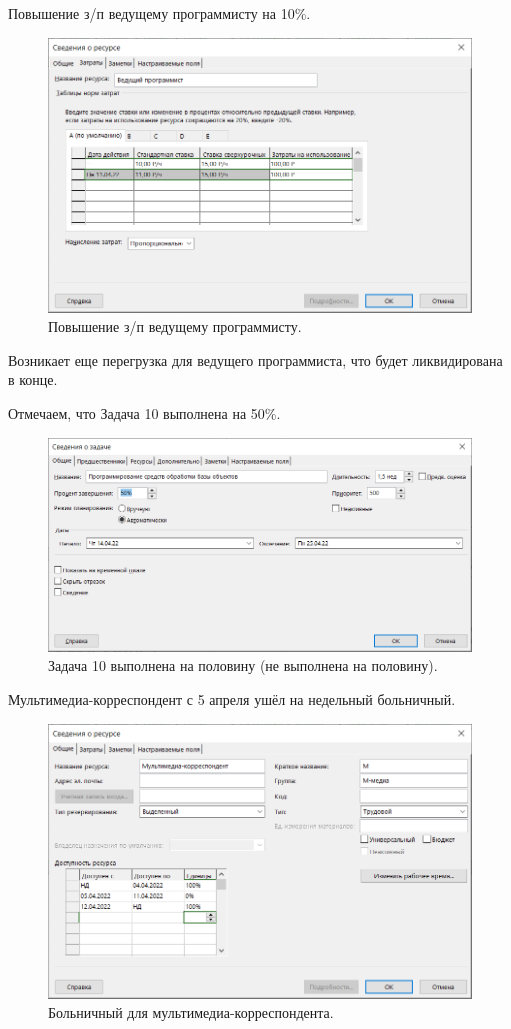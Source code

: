 \documentclass[a4paper,14pt]{extreport} %
\begin{document}
\begin{enumerate}
Повышение з/п ведущему программисту на 10\%.
\begin{figure}[H]
	\centering
	\caption{Повышение з/п ведущему программисту. }
	\includegraphics[scale=0.8]{powerup2}
\end{figure}

Возникает еще перегрузка для ведущего программиста, что будет ликвидирована в конце.

Отмечаем, что Задача 10 выполнена на 50\%.
\begin{figure}[H]
	\centering
	\caption{Задача 10 выполнена на половину (не выполнена на половину). }
	\includegraphics[scale=0.8]{task10}
\end{figure}

Мультимедиа-корреспондент с 5 апреля ушёл на недельный больничный.
\begin{figure}[H]
	\centering
	\caption{Больничный для мультимедиа-корреспондента. }
	\includegraphics[scale=0.8]{chill}
\end{figure}


\end{enumerate}
\end{document}

